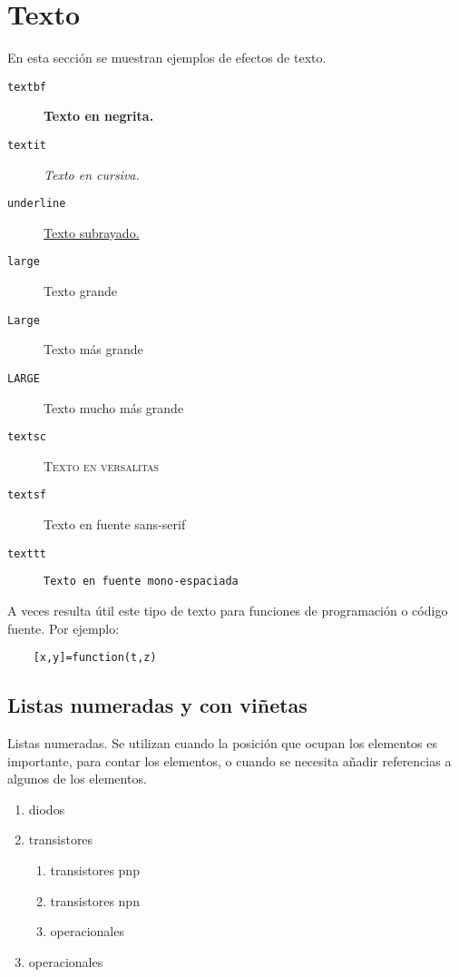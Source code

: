 \section{Texto} 
\label{sec:texto}

\noindent En esta sección se muestran ejemplos de efectos de texto.

\begin{description}
\item[\texttt{textbf}] \textbf{Texto en negrita.}

\item[\texttt{textit}] \textit{Texto en cursiva.}

\item[\texttt{underline}] \underline{Texto subrayado.}

\item[\texttt{large}] {\large Texto grande}

\item[\texttt{Large}] {\Large Texto más grande}

\item[\texttt{LARGE}] {\LARGE Texto mucho más grande}

\item[\texttt{textsc}] \textsc{Texto en versalitas}

\item[\texttt{textsf}] \textsf{Texto en fuente sans-serif}

\item[\texttt{texttt}] \texttt{Texto en fuente mono-espaciada}
\end{description}

A veces resulta útil este tipo de texto para funciones de programación o código fuente. Por ejemplo:

\begin{verbatim}
    [x,y]=function(t,z) 
\end{verbatim}

\subsection{Listas numeradas y con viñetas} 

Listas numeradas. Se utilizan cuando la posición que ocupan los elementos es importante, para contar los elementos, o cuando se necesita añadir referencias a algunos de los elementos.

\begin{enumerate}
\item diodos
\item transistores
    \begin{enumerate}
    \item transistores pnp
    \item transistores npn
    \item operacionales
    \end{enumerate}
\item operacionales
\end{enumerate}

